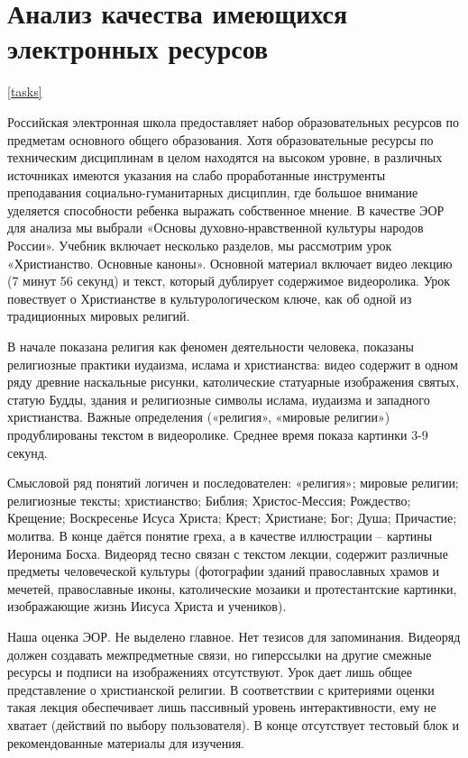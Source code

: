 \section{Анализ качества имеющихся электронных ресурсов}
\ref{tasks}

Российская электронная школа предоставляет набор образовательных ресурсов по предметам основного общего образования. Хотя образовательные ресурсы по техническим дисциплинам в целом находятся на высоком уровне, в различных источниках имеются указания на слабо проработанные инструменты преподавания социально-гуманитарных дисциплин, где большое внимание уделяется способности ребенка выражать собственное мнение.\cite{lastochkin19}
В качестве ЭОР для анализа мы выбрали «Основы духовно-нравственной культуры народов России». Учебник включает несколько разделов, мы рассмотрим урок «Христианство. Основные каноны»\cite{sample}. Основной материал включает видео лекцию (7 минут 56 секунд) и текст, который дублирует содержимое видеоролика. Урок повествует о Христианстве в культурологическом ключе, как об одной из традиционных мировых религий.

В начале показана религия как феномен деятельности человека, показаны религиозные практики иудаизма, ислама и христианства: видео содержит в одном ряду древние наскальные рисунки, католические статуарные изображения святых, статую Будды, здания и религиозные символы ислама, иудаизма и западного христианства. Важные определения («религия», «мировые религии») продублированы текстом в видеоролике. Среднее время показа картинки 3-9 секунд.

Смысловой ряд понятий логичен и последователен: «религия»; мировые религии; религиозные тексты; христианство; Библия; Христос-Мессия; Рождество; Крещение; Воскресенье Исуса Христа; Крест; Христиане; Бог; Душа; Причастие; молитва. В конце даётся понятие греха, а в качестве иллюстрации – картины Иеронима Босха. Видеоряд тесно связан с текстом лекции, содержит различные предметы человеческой культуры (фотографии зданий православных храмов и мечетей, православные иконы, католические мозаики и протестантские картинки, изображающие жизнь Иисуса Христа и учеников).

Наша оценка ЭОР. Не выделено главное. Нет тезисов для запоминания. Видеоряд должен создавать межпредметные связи, но гиперссылки на другие смежные ресурсы и подписи на изображениях отсутствуют. Урок дает лишь общее представление о христианской религии. В соответствии с критериями оценки такая лекция обеспечивает лишь пассивный уровень интерактивности, ему не хватает (действий по выбору пользователя). В конце отсутствует тестовый блок и рекомендованные материалы для изучения.

